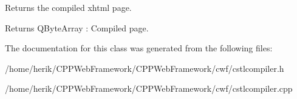 Returns the compiled xhtml page. 

\begin{DoxyReturn}{Returns}
Q\+Byte\+Array \+: Compiled page. 
\end{DoxyReturn}


The documentation for this class was generated from the following files\+:\begin{DoxyCompactItemize}
\item 
/home/herik/\+C\+P\+P\+Web\+Framework/\+C\+P\+P\+Web\+Framework/cwf/cstlcompiler.\+h\item 
/home/herik/\+C\+P\+P\+Web\+Framework/\+C\+P\+P\+Web\+Framework/cwf/cstlcompiler.\+cpp\end{DoxyCompactItemize}
